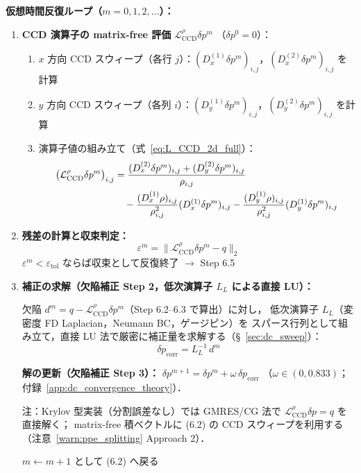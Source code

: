 \textbf{仮想時間反復ループ（$m = 0, 1, 2, \dots$）：}
\begin{enumerate}
  \item[(6.2)] \textbf{CCD 演算子の matrix-free 評価} $\mathcal{L}_{\mathrm{CCD}}^{\rho}\delta p^m$
  （$\delta p^0 = 0$）：
  \begin{enumerate}
    \item $x$ 方向 CCD スウィープ（各行 $j$）：$(D_x^{(1)}\delta p^m)_{i,j}$，$(D_x^{(2)}\delta p^m)_{i,j}$ を計算
    \item $y$ 方向 CCD スウィープ（各列 $i$）：$(D_y^{(1)}\delta p^m)_{i,j}$，$(D_y^{(2)}\delta p^m)_{i,j}$ を計算
    \item 演算子値の組み立て（式~\eqref{eq:L_CCD_2d_full}）：
    \begin{align}
      \bigl(\mathcal{L}_{\mathrm{CCD}}^{\rho}\delta p^m\bigr)_{i,j}
      &= \frac{(D_x^{(2)}\delta p^m)_{i,j} + (D_y^{(2)}\delta p^m)_{i,j}}{\rho_{i,j}}
      \notag\\
      &\quad
      - \frac{(D_x^{(1)}\rho)_{i,j}}{\rho_{i,j}^2}(D_x^{(1)}\delta p^m)_{i,j}
      - \frac{(D_y^{(1)}\rho)_{i,j}}{\rho_{i,j}^2}(D_y^{(1)}\delta p^m)_{i,j}
    \end{align}
  \end{enumerate}

  \item[(6.3)] \textbf{残差の計算と収束判定：}
  \[
    \varepsilon^m = \bigl\|\mathcal{L}_{\mathrm{CCD}}^{\rho}\delta p^m - q\bigr\|_2
  \]
  $\varepsilon^m < \varepsilon_{\mathrm{tol}}$ ならば収束として反復終了 $\rightarrow$ Step 6.5

  \item[(6.4)] \textbf{補正の求解（欠陥補正 Step 2，低次演算子 $L_L$ による直接 LU）：}

  欠陥 $d^m = q - \mathcal{L}_{\mathrm{CCD}}^{\rho}\delta p^m$（Step 6.2--6.3 で算出）に対し，
  低次演算子 $L_L$（変密度 FD Laplacian，Neumann BC，ゲージピン）を
  スパース行列として組み立て，直接 LU 法で厳密に補正量を求解する（§~\ref{sec:dc_sweep}）：
  \[
    \delta p_{\mathrm{corr}} = L_L^{-1}\,d^m
  \]

  \textbf{解の更新（欠陥補正 Step 3）：}
  $\delta p^{m+1} = \delta p^m + \omega\,\delta p_{\mathrm{corr}}$
  （$\omega \in (0, 0.833)$；付録~\ref{app:dc_convergence_theory}）．

  \medskip
  \noindent 注：Krylov 型実装（分割誤差なし）では GMRES/CG 法で
  $\mathcal{L}_{\mathrm{CCD}}^{\rho}\delta p = q$ を直接解く；
  matrix-free 積ベクトルに (6.2) の CCD スウィープを利用する
  （注意~\ref{warn:ppe_splitting} Approach 2）．

  $m \leftarrow m+1$ として (6.2) へ戻る
\end{enumerate}

